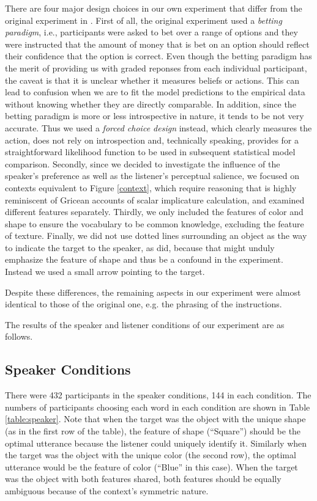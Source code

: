There are four major design choices in our own experiment that differ
from the original experiment in \cite{Frank}. First of all, the
original experiment used a \emph{betting paradigm}, i.e., participants
were asked to bet over a range of options and they were instructed
that the amount of money that is bet on an option should reflect their
confidence that the option is correct. Even though the betting
paradigm has the merit of providing us with graded reponses from each
individual participant, the caveat is that it is unclear whether it
measures beliefs or actions. This can lead to confusion when we are to
fit the model predictions to the empirical data without knowing
whether they are directly comparable. In addition, since the betting
paradigm is more or less introspective in nature, it tends to be not
very accurate. Thus we used a \emph{forced choice design} instead,
which clearly measures the action, does not rely on introspection and,
technically speaking, provides for a straightforward likelihood
function to be used in subsequent statistical model comparison.
Secondly, since we decided to investigate the influence of the
speaker's preference as well as the listener's perceptual salience, we
focused on contexts equivalent to Figure \ref{context}, which require
reasoning that is highly reminiscent of Gricean accounts of scalar
implicature calculation, and examined different features separately.
Thirdly, we only included the features of color and shape to ensure
the vocabulary to be common knowledge, excluding the feature of
texture. Finally, we did not use dotted lines surrounding an object as
the way to indicate the target to the speaker, as \cite{Frank} did,
because that might unduly emphasize the feature of shape and thus be a
confound in the experiment. Instead we used a small arrow pointing to
the target.

Despite these differences, the remaining aspects in our experiment
were almost identical to those of the original one, e.g. the phrasing
of the instructions.

The results of the speaker and listener conditions of our experiment
are as follows.

 
\subsection{Speaker Conditions}

There were 432 participants in the speaker conditions, 144 in each condition. The numbers of participants choosing each word in each condition are shown in Table \ref{table:speaker}. Note that when the target was the object with the unique shape (as in the first row of the table), the feature of shape (``Square'') should be the optimal utterance because the listener could uniquely identify it. Similarly when the target was the object with the unique color (the second row), the optimal utterance would be the feature of color (``Blue'' in this case). When the target was the object with both features shared, both features should be equally ambiguous because of the context's symmetric nature.

